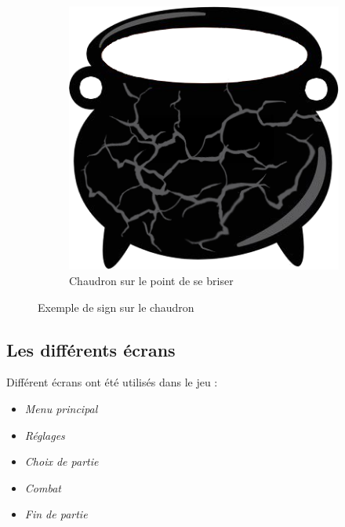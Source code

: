 \begin{figure}
\begin{subfigure}[t]{0.45\textwidth}
            \includegraphics[width=\textwidth]{image/chaudron/chaudron3.png}
            \caption{Chaudron sur le point de se briser}
        \end{subfigure}
        \caption{Exemple de sign sur le chaudron}
        \label{fig:sign}
    \end{figure}



\subsection{Les différents écrans}

Différent écrans ont été utilisés dans le jeu :
\begin{itemize}
    \item \textit{Menu principal}
    \item \textit{Réglages}
    \item \textit{Choix de partie}
    \item \textit{Combat}
    \item \textit{Fin de partie}
\end{itemize}
